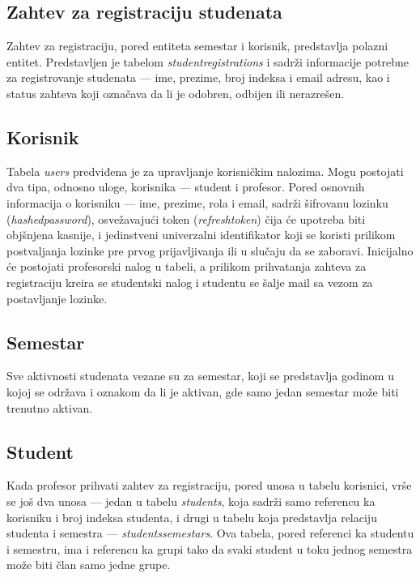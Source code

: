 \documentclass[12pt,oneside]{memoir}
\begin{document}
\subsection{Zahtev za registraciju studenata}
Zahtev za registraciju, pored entiteta semestar i korisnik, predstavlja polazni entitet. Predstavljen je tabelom \emph{student{\textunderscore}registrations} i sadrži
informacije potrebne za registrovanje studenata --- ime, prezime, broj indeksa i email adresu, kao i status zahteva koji označava da li je odobren, odbijen ili nerazrešen.

\subsection{Korisnik}
Tabela \emph{users} predviđena je za upravljanje korisničkim nalozima. Mogu postojati dva tipa, odnosno uloge, korisnika --- student i profesor. 
Pored osnovnih informacija o korisniku --- ime, prezime, rola i email, sadrži šifrovanu lozinku (\emph{hashed{\textunderscore}password}), osvežavajući
token (\emph{refresh{\textunderscore}token}) čija će upotreba biti objšnjena kasnije, i jedinstveni univerzalni identifikator koji se koristi prilikom postvaljanja lozinke
pre prvog prijavljivanja ili u slučaju da se zaboravi. Inicijalno će postojati profesorski nalog u tabeli, a prilikom prihvatanja zahteva za registraciju kreira se studentski nalog
i studentu se šalje mail sa vezom za postavljanje lozinke. 

\subsection{Semestar}
Sve aktivnosti studenata vezane su za semestar, koji se predstavlja godinom u kojoj se održava i oznakom da li je aktivan, gde samo jedan semestar može biti trenutno aktivan. 

\subsection{Student}
Kada profesor prihvati zahtev za registraciju, pored unosa u tabelu korisnici, vrše se još dva unosa --- jedan u tabelu \emph{students}, koja sadrži samo referencu ka korisniku i broj indeksa studenta, i 
drugi u tabelu koja predstavlja relaciju studenta i semestra --- \emph{students{\textunderscore}semestars}. Ova tabela, pored referenci ka studentu i semestru, ima i referencu ka grupi tako da 
svaki student u toku jednog semestra može biti član samo jedne grupe.
\end{document}
